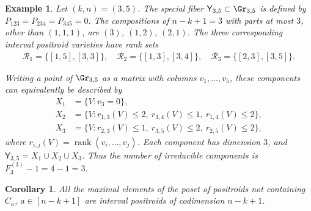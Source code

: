 \documentclass[11pt]{amsart}
\numberwithin{equation}{section}
\newtheorem{cor}[thm]{Corollary}
\newtheorem{example}[thm]{Example}
\begin{document}
\begin{example}
Let $(k,n)=(3,5)$. The special fiber
${\mathsf Y}_{3,5}\subset\Gr_{3,5}$ is defined by
$P_{123}=P_{234}=P_{345}=0$.
The compositions of $n-k+1=3$ with parts at
most $3$, other than $(1,1,1)$, are
$(3)$, $(1,2)$, $(2,1)$.
The three corresponding interval positroid
varieties have rank sets
\[
\begin{aligned}
\mathcal R_1=\{[1,5],[3,3]\},\quad \mathcal R_2=\{[1,3],[3,4]\},\quad 
\mathcal R_3=\{[2,3],[3,5]\}.
\end{aligned}
\]

Writing a point of $\Gr_{3,5}$ as a matrix
with columns $v_1,\ldots,v_5$, these
components can equivalently be described by
\[
\begin{aligned}
X_1
&=\{V:v_3=0\},\\
X_2
&=\{V:
r_{1,3}(V)\le 2,\ 
r_{3,4}(V)\le 1,\
r_{1,4}(V)\le 2\},\\
X_3
&=\{V:
r_{2,3}(V)\le 1,\
r_{3,5}(V)\le 2,\
r_{2,5}(V)\le 2\},
\end{aligned}
\]
where
$r_{i,j}(V)=\operatorname{rank}(v_i,\ldots,v_j)$.
Each component has dimension $3$, and
${\mathsf Y}_{3,5}=X_1\cup X_2\cup X_3$.
Thus the number of irreducible components is
$F_3^{(3)}-1=4-1=3$.
\end{example}


\begin{cor}
All the maximal elements of the poset of positroids not containing $C_a$, $a\in [n-k+1]$ are 
interval positroids of codimension $n-k+1$.  
\end{cor}
\end{document}
